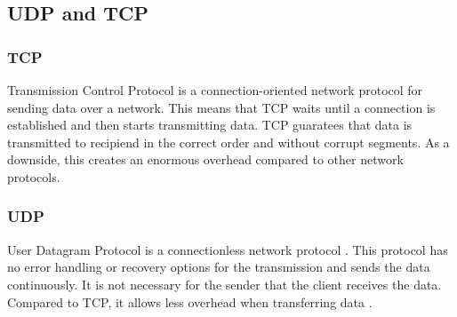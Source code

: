 \subsection{UDP and TCP}
\label{udptcp:sci}
\subsubsection{TCP}
\label{tcp:sci}
Transmission Control Protocol is a connection-oriented network protocol
for sending data over a network.
This means that TCP waits until a connection is established and
then starts transmitting data\cite{postel1981transmission}.
TCP guaratees that data is transmitted to recipiend
in the correct order and without corrupt segments.
As a downside, this creates an enormous overhead compared
to other network protocols\cite{singh2014survey}\newline.
\subsubsection{UDP}
\label{udp:sci}
User Datagram Protocol is a connectionless network protocol
\cite{postel1980user}.
This protocol has no error handling or recovery options for
 the transmission and sends the data continuously.
It is not necessary for the sender that the client 
receives the data.
Compared to TCP, it allows less overhead when transferring data
\cite{singh2014survey}.